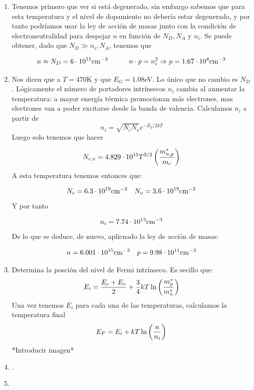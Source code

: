 	\begin{enumerate}[label=\alph*)]
		\item Tenemos primero que ver si está degenerado, sin embargo sabemos que para esta temperatura y el nivel de dopamiento no debería estar degenerado, y por tanto podríamos usar la ley de acción de masas junto con la condición de electroneutralidad para despejar $n$ en función de $N_D,N_A$ y $n_i$. Se puede obtener, dado que $N_D \gg n_i,N_A$, tenemos que

		      \begin{equation}
			      n\approx N_D = 6\cdot 10^{15} \text{cm}^{-3} \quad \quad \quad n\cdot p = n_i^2 \Rightarrow p = 1.67 \cdot 10^4 \text{cm}^{-3}
		      \end{equation}
		\item Nos dicen que a $T=470$K y que $E_G=1.08$eV. Lo único que no cambio es $N_D$. Lógicamente el número de portadores intrínsecos $n_i$ cambia al aumentar la temperatura: a mayor energía térmica promocionan más electrones, mas electrones van a poder excitarse desde la banda de valencia. Calculamos $n_i$ a partir de
		      \begin{equation}
			      n_i = \sqrt{N_cN_v} e^{-E_g/2kT}
		      \end{equation}
		      Luego solo tenemos que hacer

		      \begin{equation}
			      N_{c,v} = 4.829\cdot 10^{15} T^{3/2} \left( \frac{m_{n,p}^*}{m_e} \right)
		      \end{equation}
		      A esta temperatura tenemos entonces que:

		      \begin{equation}
			      N_c = 6.3 \cdot 10^{19} \text{cm}^{-3} \quad N_v = 3.6 \cdot 10^{19} \text{cm}^{-3}
		      \end{equation}
		      Y por tanto

		      \begin{equation}
			      n_i = 7.74 \cdot 10^{13} \text{cm}^{-3}
		      \end{equation}
		      De lo que se deduce, de nuevo, aplicnado la ley de acción de masas:

		      \begin{equation}
			      n=6.001 \cdot 10^{15} \text{cm}^{-3} \quad p = 9.98 \cdot 10^{11} \text{cm}^{-3}
		      \end{equation}
		\item Determina la posción del nivel de Fermi intrínseco. Es secillo que:
		      \begin{equation}
			      E_i = \frac{E_c + E_v}{2} + \frac{3}{4} kT \ln \left( \frac{m_p^*}{m_n^*} \right)
		      \end{equation}
		      Una vez tenemos $E_i$ para cada una de las temperaturas, calculamos la temperatura final
		      \begin{equation}
			      E_F = E_i + kT \ln \left( \frac{n}{n_i} \right)
		      \end{equation}
		      *Introducir imagen*
		\item.
		\item
	\end{enumerate}
    
